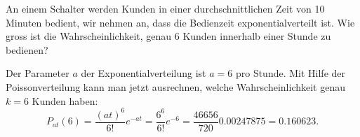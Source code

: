 An einem Schalter werden Kunden in einer durchschnittlichen
Zeit von 10 Minuten bedient, wir nehmen an, dass die Bedienzeit
exponentialverteilt ist. Wie gross ist die Wahrscheinlichkeit,
genau 6 Kunden innerhalb einer Stunde zu bedienen?

\begin{loesung}
Der Parameter $a$ der Exponentialverteilung ist $a=6$ pro Stunde.
Mit Hilfe der Poissonverteilung kann man jetzt ausrechnen,
welche Wahrscheinlichkeit genau $k=6$ Kunden haben:
\[
P_{at}(6)=\frac{(at)^6}{6!}e^{-at}=\frac{6^6}{6!}e^{-6}
=\frac{46656}{720}0.00247875
=0.160623.
\]
\end{loesung}
